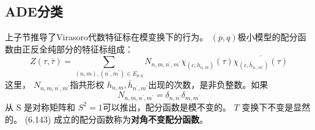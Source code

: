\subsection{ADE分类}
上子节推导了Virasoro代数特征标在模变换下的行为。 $(p,q) $极小模型的配分函数由正反全纯部分的特征标组成：
\begin{equation}
	Z(\tau, \bar{\tau})=\sum_{(n, m),\left(n^{\prime}, m^{\prime}\right) \in E_{p, q}} N_{n, m, n^{\prime}, m^{\prime}} \chi_{\left(c, h_{n, m}\right)}(\tau) \overline{\chi_{\left(c, \bar{h}_{n^{\prime}, m^{\prime}}\right)}(\tau)} 
\end{equation}
这里， $N_{n, m, n^{\prime}, m^{\prime}} $指共形权 $h_{n, m}, \bar{h}_{n^{\prime}, m^{\prime}} $出现的次数，是非负整数。如果
\begin{equation}
	N_{n, m, n^{\prime}, m^{\prime}}=\delta_{n, n^{\prime}} \delta_{m, m^{\prime}}
\end{equation} 
从 S 是对称矩阵和 $S^{2}=1 $可以推出，配分函数是模不变的。 $T$ 变换下不变是显然的。 (6.143) 成立的配分函数称为\textbf{对角不变配分函数}。

